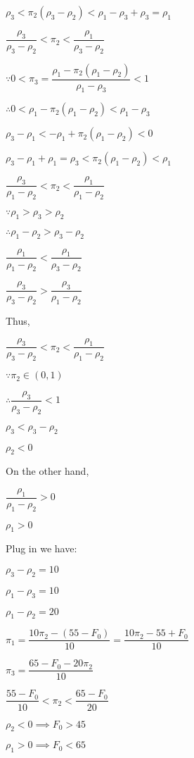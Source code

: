 \documentclass{article}
\begin{document}
$\rho_{3}<\pi_{2}\left(\rho_{3}-\rho_{2}\right)<\rho_{1}-\rho_{3}+\rho_{3}=\rho_{1}$

$\dfrac{\rho_{3}}{\rho_{3}-\rho_{2}}<\pi_{2}<\dfrac{\rho_{1}}{\rho_{3}-\rho_{2}}$

$\because0<\pi_{3}=\dfrac{\rho_{1}-\pi_{2}\left(\rho_{1}-\rho_{2}\right)}{\rho_{1}-\rho_{3}}<1$

$\therefore0<\rho_{1}-\pi_{2}\left(\rho_{1}-\rho_{2}\right)<\rho_{1}-\rho_{3}$

$\rho_{3}-\rho_{1}<-\rho_{1}+\pi_{2}\left(\rho_{1}-\rho_{2}\right)<0$

$\rho_{3}-\rho_{1}+\rho_{1}=\rho_{3}<\pi_{2}\left(\rho_{1}-\rho_{2}\right)<\rho_{1}$

$\dfrac{\rho_{3}}{\rho_{1}-\rho_{2}}<\pi_{2}<\dfrac{\rho_{1}}{\rho_{1}-\rho_{2}}$

$\because\rho_{1}>\rho_{3}>\rho_{2}$

$\therefore\rho_{1}-\rho_{2}>\rho_{3}-\rho_{2}$

$\dfrac{\rho_{1}}{\rho_{1}-\rho_{2}}<\dfrac{\rho_{1}}{\rho_{3}-\rho_{2}}$

$\dfrac{\rho_{3}}{\rho_{3}-\rho_{2}}>\dfrac{\rho_{3}}{\rho_{1}-\rho_{2}}$

Thus,

$\dfrac{\rho_{3}}{\rho_{3}-\rho_{2}}<\pi_{2}<\dfrac{\rho_{1}}{\rho_{1}-\rho_{2}}$

$\because \pi_{2}\in\left(0,1\right)$

$\therefore\dfrac{\rho_{3}}{\rho_{3}-\rho_{2}}<1$

$\rho_{3}<\rho_{3}-\rho_{2}$

$\rho_{2}<0$

On the other hand,

$\dfrac{\rho_{1}}{\rho_{1}-\rho_{2}}>0$

$\rho_{1}>0$

Plug in we have:

$\rho_{3}-\rho_{2}=10$

$\rho_{1}-\rho_{3}=10$

$\rho_{1}-\rho_{2}=20$

$\pi_{1}=\dfrac{10\pi_{2}-\left(55-F_{0}\right)}{10}=\dfrac{10\pi_{2}-55+F_{0}}{10}$

$\pi_{3}=\dfrac{65-F_{0}-20\pi_{2}}{10}$

$\dfrac{55-F_{0}}{10}<\pi_{2}<\dfrac{65-F_{0}}{20}$

$\rho_{2}<0 \implies F_{0}>45$

$\rho_{1}>0 \implies F_{0}<65$
\end{document}
